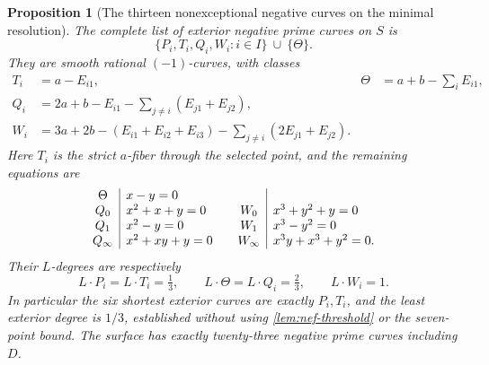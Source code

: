 \documentclass[11pt,reqno]{amsart}
\newtheorem{proposition}[proposition]{Proposition}
\theoremstyle{definition}
\theoremstyle{remark}
\numberwithin{equation}{section}
\begin{document}
\begin{proposition}[The thirteen nonexceptional negative curves on the minimal resolution]
\label{prop:equality-negative-curves}
The complete list of exterior negative prime curves on $S$ is
\[
 \{P_i,T_i,Q_i,W_i:i\in I\}\ \cup\ \{\Theta\}.
\]
They are smooth rational $(-1)$-curves, with classes
\[
\begin{aligned}
 T_i&=a-E_{i1},& \Theta&=a+b-\sum_iE_{i1},\\
 Q_i&=2a+b-E_{i1}-\sum_{j\ne i}(E_{j1}+E_{j2}),\\
 W_i&=3a+2b-(E_{i1}+E_{i2}+E_{i3})
                    -\sum_{j\ne i}(2E_{j1}+E_{j2}).
\end{aligned}
\]
Here $T_i$ is the strict $a$-fiber through the selected point, and the
remaining equations are
\[
\begin{array}{c|l@{\qquad}c|l}
\Theta&x-y=0&&\\
Q_0&x^2+x+y=0&W_0&x^3+y^2+y=0\\
Q_1&x^2-y=0&W_1&x^3-y^2=0\\
Q_\infty&x^2+xy+y=0&W_\infty&x^3y+x^3+y^2=0.
\end{array}
\]
Their $L$-degrees are respectively
\[
 L\cdot P_i=L\cdot T_i=\tfrac13,\qquad
 L\cdot\Theta=L\cdot Q_i=\tfrac23,\qquad L\cdot W_i=1.
\]
In particular the six shortest exterior curves are exactly
$P_i,T_i$, and the least exterior degree is $1/3$, established without
using \cref{lem:nef-threshold} or the seven-point bound.
The surface has exactly twenty-three negative prime curves including $D$.
\end{proposition}
\end{document}
